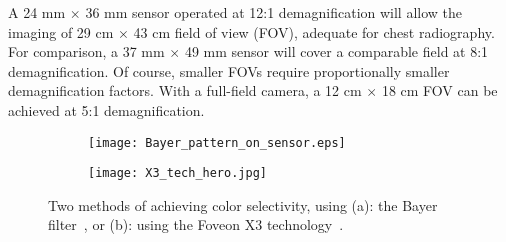 A 24 mm $\times$ 36 mm sensor operated at 12:1 demagnification will allow the imaging of 29 cm $\times$ 43 cm field of view (FOV), adequate for chest radiography. For comparison, a 37 mm $\times$ 49 mm sensor will cover a comparable field at 8:1 demagnification. Of course, smaller FOVs require proportionally smaller demagnification factors.  With a full-field camera, a 12 cm $\times$ 18 cm FOV can be achieved at 5:1 demagnification.

\begin{figure}[h]
	\begin{subfigure}[b]{0.4\linewidth}
		\centering
		\texttt{[image: Bayer\_pattern\_on\_sensor.eps]}
		\caption{}
		\label{fig:bayer_pattern_on_sensor}
	\end{subfigure}
	\hspace{0.5cm}
	\begin{subfigure}[b]{0.4\linewidth}
		\centering
		\texttt{[image: X3\_tech\_hero.jpg]}
		\caption{}
		\label{fig:foveon_sensor}
	\end{subfigure}
\caption{Two methods of achieving color selectivity, using (a): the Bayer filter~\citep{wikibayer}, or (b): using the Foveon X3 technology~\citep{foveon}.}
\label{fig:color_selectivity}	
\end{figure}

